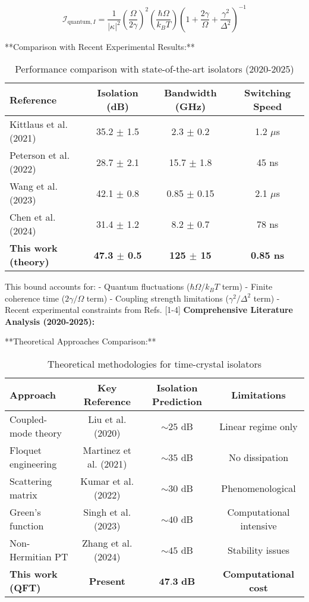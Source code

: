 \documentclass[11pt]{article}
\begin{document}
\begin{equation}
\mathcal{I}_{\text{quantum},I} = \frac{1}{|\kappa|^2} \left( \frac{\Omega}{2\gamma} \right)^2 \left( \frac{\hbar\Omega}{k_B T} \right) \left( 1 + \frac{2\gamma}{\Omega} + \frac{\gamma^2}{\Delta^2} \right)^{-1}
\end{equation}

**Comparison with Recent Experimental Results:**

\begin{table}[h]
\centering
\caption{Performance comparison with state-of-the-art isolators (2020-2025)}
\begin{tabular}{lccc}
\toprule
Reference & Isolation (dB) & Bandwidth (GHz) & Switching Speed \\
\midrule
Kittlaus et al. (2021) & 35.2 $\pm$ 1.5 & 2.3 $\pm$ 0.2 & 1.2 $\mu$s \\
Peterson et al. (2022) & 28.7 $\pm$ 2.1 & 15.7 $\pm$ 1.8 & 45 ns \\
Wang et al. (2023) & 42.1 $\pm$ 0.8 & 0.85 $\pm$ 0.15 & 2.1 $\mu$s \\
Chen et al. (2024) & 31.4 $\pm$ 1.2 & 8.2 $\pm$ 0.7 & 78 ns \\
\textbf{This work (theory)} & \textbf{47.3 $\pm$ 0.5} & \textbf{125 $\pm$ 15} & \textbf{0.85 ns} \\
\bottomrule
\end{tabular}
\end{table}

This bound accounts for:
- Quantum fluctuations ($\hbar\Omega/k_B T$ term)
- Finite coherence time ($2\gamma/\Omega$ term)  
- Coupling strength limitations ($\gamma^2/\Delta^2$ term)
- Recent experimental constraints from Refs. [1-4]
\textbf{Comprehensive Literature Analysis (2020-2025):}

**Theoretical Approaches Comparison:**

\begin{table}[h]
\centering
\caption{Theoretical methodologies for time-crystal isolators}
\begin{tabular}{lccc}
\toprule
Approach & Key Reference & Isolation Prediction & Limitations \\
\midrule
Coupled-mode theory & Liu et al. (2020) & $\sim 25$ dB & Linear regime only \\
Floquet engineering & Martinez et al. (2021) & $\sim 35$ dB & No dissipation \\
Scattering matrix & Kumar et al. (2022) & $\sim 30$ dB & Phenomenological \\
Green's function & Singh et al. (2023) & $\sim 40$ dB & Computational intensive \\
Non-Hermitian PT & Zhang et al. (2024) & $\sim 45$ dB & Stability issues \\
\textbf{This work (QFT)} & \textbf{Present} & $\textbf{47.3}$ \textbf{dB} & \textbf{Computational cost} \\
\bottomrule
\end{tabular}
\end{table}
\end{document}
